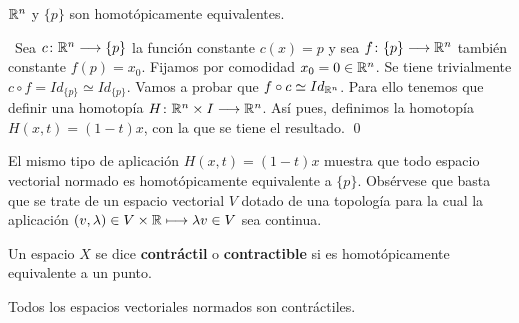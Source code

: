 \documentclass[GTS.tex]{subfiles}
\begin{document}
\begin{ej} $\mathbb{R}^n$ y $\{p\}$ son homotópicamente equivalentes.
\begin{solucion}\
Sea $c\colon{\mathbb{R}^n}\longrightarrow{\{p\}}$ la función constante $c(x)=p$ y sea $f\colon{\{p\}}\longrightarrow{\mathbb{R}^n}$ también constante $f(p)=x_0$. Fijamos por comodidad $x_0=0\in\mathbb{R}^n$. Se tiene trivialmente $c\circ f = Id_{\{p\}}\simeq Id_{\{p\}}$. Vamos a probar que $f\circ c\simeq Id_{\mathbb{R}^n}$. Para ello tenemos que definir una homotopía $H\colon{\mathbb{R}^n\times I}\longrightarrow{\mathbb{R}^n}$. Así pues, definimos la homotopía $H(x,t)=(1-t)x$, con la que se tiene el resultado. \qed
\end{solucion}
\end{ej}

El mismo tipo de aplicación $H(x,t)=(1-t)x$ muestra que todo espacio vectorial normado es homotópicamente equivalente a $\{p\}$. Obsérvese que basta que se trate de un espacio vectorial $V$ dotado de una topología para la cual la aplicación $(v,\lambda)\in V\times\mathbb{R}\longmapsto \lambda v\in V$ sea continua.


\begin{defi} Un espacio $X$ se dice \textbf{contráctil} o \textbf{contractible} si es homotópicamente equivalente a un punto.
\end{defi}
\begin{nota} Todos los espacios vectoriales normados son contráctiles.
\end{nota}
\end{document}
